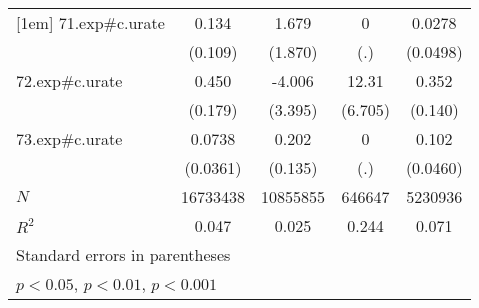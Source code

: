 {\begin{tabular}{l*{4}{c}}
[1em]
71.exp#c.urate&       0.134         &       1.679         &           0         &      0.0278         \\
            &     (0.109)         &     (1.870)         &         (.)         &    (0.0498)         \\
[1em]
72.exp#c.urate&       0.450\sym{*}  &      -4.006         &       12.31         &       0.352\sym{*}  \\
            &     (0.179)         &     (3.395)         &     (6.705)         &     (0.140)         \\
[1em]
73.exp#c.urate&      0.0738\sym{*}  &       0.202         &           0         &       0.102\sym{*}  \\
            &    (0.0361)         &     (0.135)         &         (.)         &    (0.0460)         \\
\hline
\(N\)       &    16733438         &    10855855         &      646647         &     5230936         \\
\(R^{2}\)   &       0.047         &       0.025         &       0.244         &       0.071         \\
\hline\hline
\multicolumn{5}{l}{\footnotesize Standard errors in parentheses}\\
\multicolumn{5}{l}{\footnotesize \sym{*} \(p<0.05\), \sym{**} \(p<0.01\), \sym{***} \(p<0.001\)}\\
\end{tabular}
}
